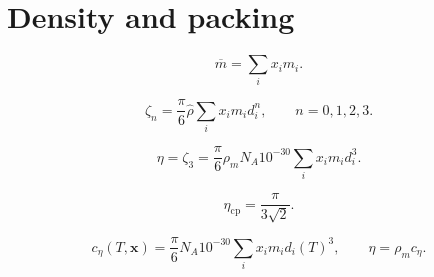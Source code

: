 \documentclass[11pt]{article}
\begin{document}
\section{Density and packing}

\begin{equation}
\overline{m}=\sum_i x_i m_i.
\label{eq:mean_segment_count}
\end{equation}

\begin{equation}
\zeta_n=\frac{\pi}{6}\widehat{\rho}\sum_i x_i m_i d_i^n,
\qquad n=0,1,2,3.
\label{eq:packing_moments}
\end{equation}

\begin{equation}
\eta=\zeta_3
=\frac{\pi}{6}\rho_mN_A10^{-30}\sum_i x_i m_i d_i^3.
\label{eq:packing_fraction}
\end{equation}

\begin{equation}
\eta_{\mathrm{cp}}=\frac{\pi}{3\sqrt{2}}.
\label{eq:close_packing_fraction}
\end{equation}

\begin{equation}
c_\eta(T,\boldsymbol{x})=
\frac{\pi}{6}N_A10^{-30}\sum_i x_i m_i d_i(T)^3,
\qquad \eta=\rho_m c_\eta.
\label{eq:packing_fraction_coefficient}
\end{equation}
\end{document}
